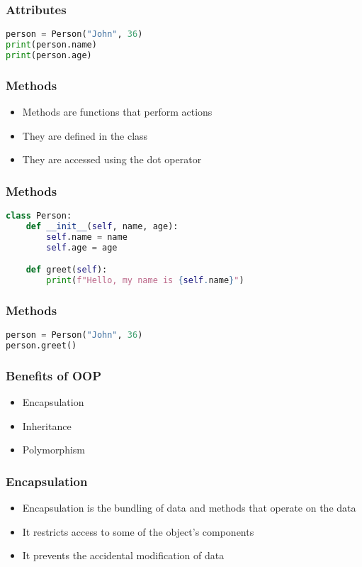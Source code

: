 \documentclass[serif, 9pt, aspectratio=32]{beamer}
\begin{document}
\begin{frame}[fragile]
    \frametitle{Attributes}
    \begin{lstlisting}[language=Python]
person = Person("John", 36)
print(person.name)
print(person.age)
    \end{lstlisting}
\end{frame}

\begin{frame}
    \centering
    \frametitle{Methods}
    \begin{itemize}
        \setlength{\itemsep}{2em}
        \item Methods are functions that perform actions
        \item They are defined in the class
        \item They are accessed using the dot operator
    \end{itemize}
\end{frame}

\begin{frame}[fragile]
    \frametitle{Methods}
    \begin{lstlisting}[language=Python]
class Person:
    def __init__(self, name, age):
        self.name = name
        self.age = age

    def greet(self):
        print(f"Hello, my name is {self.name}")
    \end{lstlisting}
\end{frame}

\begin{frame}[fragile]
    \frametitle{Methods}
    \begin{lstlisting}[language=Python]
person = Person("John", 36)
person.greet()
    \end{lstlisting}
\end{frame}

\begin{frame}
    \centering
    \frametitle{Benefits of OOP}
    \begin{itemize}
        \setlength{\itemsep}{2em}
        \item Encapsulation
        \item Inheritance
        \item Polymorphism
    \end{itemize}
\end{frame}

\begin{frame}
    \centering
    \frametitle{Encapsulation}
    \begin{itemize}
        \setlength{\itemsep}{2em}
        \item Encapsulation is the bundling of data and methods that operate on the data
        \item It restricts access to some of the object's components
        \item It prevents the accidental modification of data
    \end{itemize}
\end{frame}
\end{document}
